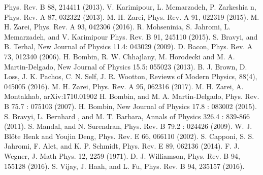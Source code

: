 \documentclass[preprintnumbers, showpacs, floatfix,twocolumn,
preprintnumbers, superscriptaddress]{revtex4}
\begin{document}
\begin{thebibliography}{99}
Phys. Rev. B 88, 214411 (2013).
V. Karimipour, L. Memarzadeh, P. Zarkeshia
n, Phys. Rev. A 87, 032322 (2013).
M. H. Zarei, Phys. Rev. A 91, 022319 (2015).
M. H. Zarei, Phys. Rev. A 93, 042306 (2016).
R. Mohseninia, S. Jahromi, L. Memarzadeh, and V. Karimipour
Phys. Rev. B 91, 245110 (2015).
S. Bravyi, and B. Terhal, New Journal of Physics 11.4: 043029 (2009).
D. Bacon, Phys. Rev. A 73, 012340 (2006).
H. Bombin, R. W. Chhajlany, M. Horodecki and M. A. Martin-Delgado, New Journal of Physics 15.5: 055023 (2013).
B. J. Brown, D. Loss, J. K. Pachos, C. N. Self, J. R. Wootton, Reviews of Modern Physics, 88(4), 045005 (2016).
M. H. Zarei, Phys. Rev. A 95, 062316 (2017).
M. H. Zarei, A. Montakhab, arXiv:1710.01902
H. Bombin, and M. A. Martin-Delgado, Phys. Rev. B 75.7 : 075103 (2007).
H. Bombin, New Journal of Physics 17.8 : 083002 (2015).
S. Bravyi, L. Bernhard , and M. T. Barbara, Annals of Physics 326.4 : 839-866 (2011).
S. Mandal, and N. Surendran, Phys. Rev. B 79.2 : 024426 (2009).
W. J. Bl\"{o}te Henk and Youjin Deng, Phys. Rev. E 66, 066110 (2002).
S. Capponi, S. S. Jahromi, F. Alet, and K. P. Schmidt, Phys. Rev. E 89, 062136 (2014).
F. J. Wegner, J. Math Phys. 12, 2259 (1971).
D. J. Williamson, Phys. Rev. B 94, 155128 (2016).
S. Vijay, J. Haah, and L. Fu, Phys. Rev. B 94, 235157 (2016).
\end{thebibliography}
\end{document}
